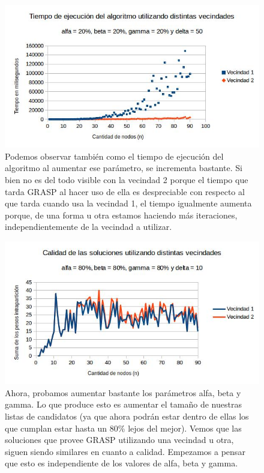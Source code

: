 \documentclass[a4paper]{article}
\begin{document}
\begin{figure}[H]
\centering
\includegraphics[scale=0.7]{20202050c.jpg}\caption{Podemos observar también como el tiempo de ejecución del algoritmo al aumentar ese parámetro, se incrementa bastante. Si bien no es del todo visible con la vecindad 2 porque el tiempo que tarda GRASP al hacer uso de ella es despreciable con respecto al que tarda cuando usa la vecindad 1, el tiempo igualmente aumenta porque, de una forma u otra estamos haciendo más iteraciones, independientemente de la vecindad a utilizar.}
\end{figure}

\begin{figure}[H]
\centering
\includegraphics[scale=0.7]{80808010.jpg}\caption{Ahora, probamos aumentar bastante los parámetros alfa, beta y gamma. Lo que produce esto es aumentar el tamaño de nuestras listas de candidatos (ya que ahora podrán estar dentro de ellas los que cumplan estar hasta un 80\% lejos del mejor). Vemos que las soluciones que provee GRASP utilizando una vecindad u otra, siguen siendo similares en cuanto a calidad. Empezamos a pensar que esto es independiente de los valores de alfa, beta y gamma.}
\end{figure}
\end{document}
